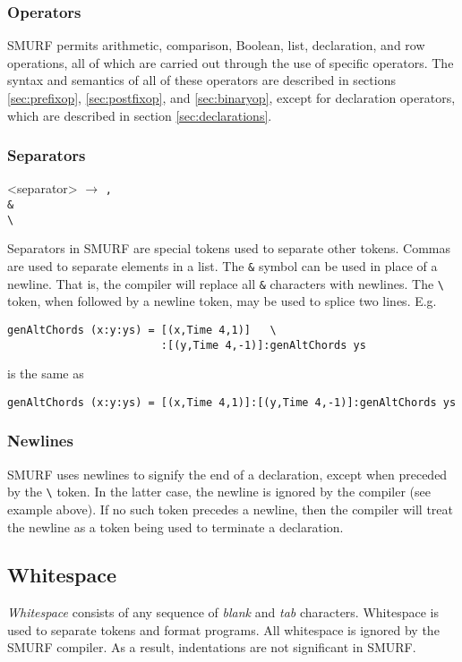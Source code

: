 \subsubsection{Operators}
SMURF permits arithmetic, comparison, Boolean, list, declaration, and row operations, all of which
are carried out through the use of specific operators. The syntax and semantics of all of these
operators are described in sections \ref{sec:prefixop}, \ref{sec:postfixop}, and \ref{sec:binaryop},
except for declaration operators, which are described in section \ref{sec:declarations}.


\subsubsection{Separators}

\begin{grammar}
<separator> $\rightarrow$ \texttt{,} \\
												  \texttt{\&} \\
													\texttt{\textbackslash}
\end{grammar}

Separators in SMURF are special tokens used to separate other tokens. 
Commas are used to separate elements in a list.
The \texttt{\&} symbol can be used in place of a newline. That is, the compiler
will replace all \texttt{\&} characters with newlines. The
\texttt{\textbackslash} token, when followed by a newline token,
may be used to splice two lines. E.g.
\begin{lstlisting}
genAltChords (x:y:ys) = [(x,Time 4,1)]   \
                        :[(y,Time 4,-1)]:genAltChords ys
\end{lstlisting}
is the same as 
\begin{lstlisting}
genAltChords (x:y:ys) = [(x,Time 4,1)]:[(y,Time 4,-1)]:genAltChords ys
\end{lstlisting}

\subsubsection{Newlines}
SMURF uses newlines to signify the end of a declaration, except
when preceded by the \texttt{\textbackslash} token. In the latter case, the newline is ignored by the compiler 
(see example above). If no such token precedes a newline, then the compiler will treat the newline as
a token being used to terminate a declaration.

\subsection{Whitespace}
\label{sec:whitespaces}
{\it Whitespace} consists of any sequence of {\it blank} and {\it tab} characters.
Whitespace is used to
separate tokens and format programs. All whitespace is ignored by the
SMURF compiler. As a result, indentations are not significant in SMURF.

